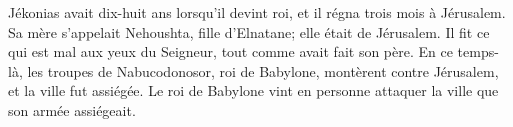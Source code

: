 Jékonias avait dix-huit ans lorsqu’il devint roi, et il régna trois mois à Jérusalem.
	Sa mère s’appelait Nehoushta, fille d’Elnatane; elle était de Jérusalem.
Il fit ce qui est mal aux yeux du Seigneur, tout comme avait fait son père.
En ce temps-là, les troupes de Nabucodonosor, roi de Babylone,
	montèrent contre Jérusalem, et la ville fut assiégée.
Le roi de Babylone vint en personne attaquer la ville que son armée assiégeait.

